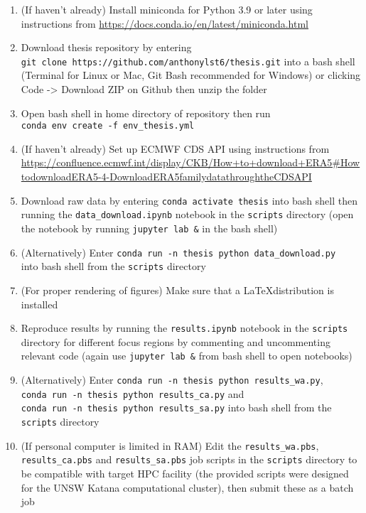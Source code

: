 \begin{enumerate}
	\item (If haven't already) Install miniconda for Python 3.9 or later using instructions from \url{https://docs.conda.io/en/latest/miniconda.html}
	\item Download thesis repository by entering \\ \verb+git clone https://github.com/anthonylst6/thesis.git+ into a bash shell (Terminal for Linux or Mac, Git Bash recommended for Windows) or clicking Code -> Download ZIP on Github then unzip the folder
	\item Open bash shell in home directory of repository then run \\ \verb+conda env create -f env_thesis.yml+
	\item (If haven't already) Set up \ac{ECMWF} \ac{CDS} API using instructions from \url{https://confluence.ecmwf.int/display/CKB/How+to+download+ERA5#HowtodownloadERA5-4-DownloadERA5familydatathroughtheCDSAPI}
	\item Download raw data by entering \verb+conda activate thesis+ into bash shell then running the \verb+data_download.ipynb+ notebook in the \verb+scripts+ directory (open the notebook by running \verb+jupyter lab &+ in the bash shell)
	\item (Alternatively) Enter \verb+conda run -n thesis python data_download.py+ \\ into bash shell from the \verb+scripts+ directory
	\item (For proper rendering of figures) Make sure that a \LaTeX distribution is installed
	\item Reproduce results by running the \verb+results.ipynb+ notebook in the \verb+scripts+ directory for different focus regions by commenting and uncommenting relevant code (again use \verb+jupyter lab &+ from bash shell to open notebooks)
	\item (Alternatively) Enter \verb+conda run -n thesis python results_wa.py+, \\ \verb+conda run -n thesis python results_ca.py+ and \\ \verb+conda run -n thesis python results_sa.py+ into bash shell from the \\ \verb+scripts+ directory
	\item (If personal computer is limited in RAM) Edit the \verb+results_wa.pbs+, \\ \verb+results_ca.pbs+ and \verb+results_sa.pbs+ job scripts in the \verb+scripts+ directory to be compatible with target HPC facility (the provided scripts were designed for the UNSW Katana computational cluster), then submit these as a batch job
\end{enumerate}

